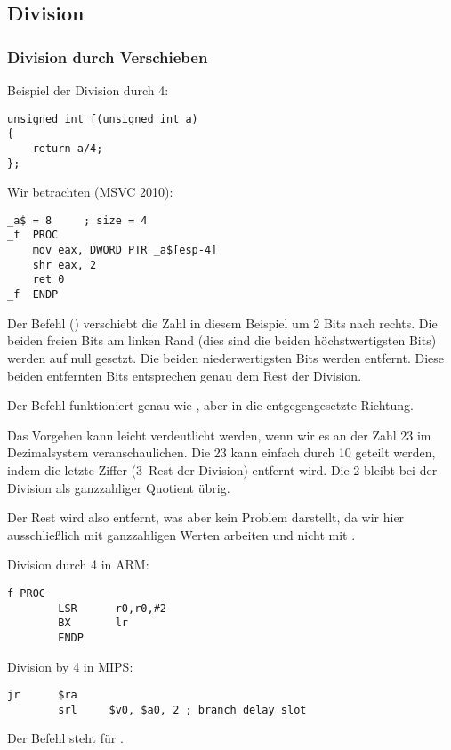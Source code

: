 \subsection{Division}

\subsubsection{Division durch Verschieben}
\label{division_by_shifting}

Beispiel der Division durch 4:

\begin{lstlisting}
unsigned int f(unsigned int a)
{
	return a/4;
};
\end{lstlisting}

Wir betrachten (MSVC 2010):

\begin{lstlisting}[caption=MSVC 2010]
_a$ = 8		; size = 4
_f	PROC
	mov	eax, DWORD PTR _a$[esp-4]
	shr	eax, 2
	ret	0
_f	ENDP
\end{lstlisting}

\label{SHR}

Der Befehl \SHR () verschiebt die Zahl in diesem Beispiel um 2
Bits nach rechts. Die beiden freien Bits am linken Rand (dies sind die beiden
höchstwertigsten Bits) werden auf null gesetzt. 
Die beiden niederwertigsten Bits werden entfernt. 
Diese beiden entfernten Bits entsprechen genau dem Rest der Division.


Der \SHR Befehl funktioniert genau wie \SHL, aber in die entgegengesetzte
Richtung.


Das Vorgehen kann leicht verdeutlicht werden, wenn wir es an der Zahl 23 im
Dezimalsystem veranschaulichen. Die 23 kann einfach durch 10 geteilt werden,
indem die letzte Ziffer (3--Rest der Division) entfernt wird. Die 2 bleibt bei
der Division als ganzzahliger \gls{Quotient} übrig.

Der Rest wird also entfernt, was aber kein Problem darstellt, da wir hier
ausschließlich mit ganzzahligen Werten arbeiten und nicht mit .

Division durch 4 in ARM:

\begin{lstlisting}[caption=\NonOptimizingKeilVI (\ARMMode)]
f PROC
        LSR      r0,r0,#2
        BX       lr
        ENDP
\end{lstlisting}

Division by 4 in MIPS:

\begin{lstlisting}[caption=\Optimizing GCC 4.4.5 (IDA)]
        jr      $ra
        srl     $v0, $a0, 2 ; branch delay slot
\end{lstlisting}

Der Befehl \SRL steht für .
